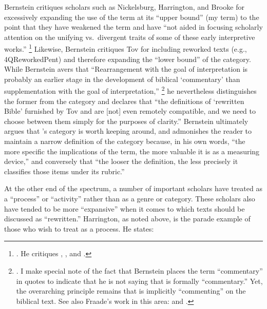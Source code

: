 Bernstein critiques scholars such as Nickelsburg, Harrington, and Brooke for excessively expanding the use of the term \rwb at its ``upper bound'' (my term) to the point that they have weakened the term and have ``not aided in focusing scholarly attention on the unifying vs.~divergent traits of some of these early interpretive works.''%
    \footnote{%
        \Cite[179]{bernstein_textus2005}. He critiques 
        \cite{nickelsburg_stone1984}, 
        \cite{harrington_kraft-nickelsburg1986}, and 
        \cite{brooke_schiffman-vanderkam2000}.}
Likewise, Bernstein critiques Tov for including reworked texts (e.g., 4QReworkedPent) and therefore expanding the ``lower bound'' of the category. While Bernstein avers that ``Rearrangement with the goal of interpretation is probably an earlier stage in the development of biblical `commentary' than supplementation with the goal of interpretation,''%
    \footnote{%
        \Cite[183]{bernstein_textus2005}. I make special note of the fact that Bernstein places the term ``commentary'' in quotes to indicate that he is not saying that \rwb is formally ``commentary.'' Yet, the overarching principle remains that \rwb is implicitly ``commenting'' on the biblical text. See also Fraade's work in this area: 
        \cite{fraade_bakhos2006} and 
        \cite{fraade_zsengeller2014}.}
he nevertheless distinguishes the former from the category \rwb and declares that ``the definitions of `rewritten Bible' furnished by Tov and \vermes are [not] even remotely compatible, and we need to choose between them simply for the purposes of clarity.''%
    \autocite[185]{bernstein_textus2005}
Bernstein ultimately argues that \vermes's category is worth keeping around, and admonishes the reader to maintain a narrow definition of the category because, in his own words, ``the more specific the implications of the term, the more valuable it is as a measuring device,''%
    \autocite[195]{bernstein_textus2005}
and conversely that ``the looser the definition, the less precisely it classifies those items under its rubric.''%
    \autocite[195]{bernstein_textus2005} 

At the other end of the spectrum, a number of important scholars have treated \rwb as a ``process'' or ``activity'' rather than as a genre or category. These scholars also have tended to be more ``expansive'' when it comes to which texts should be discussed as ``rewritten.'' Harrington, as noted above, is the parade example of those who wish to treat \rwb as a process. He states: 


